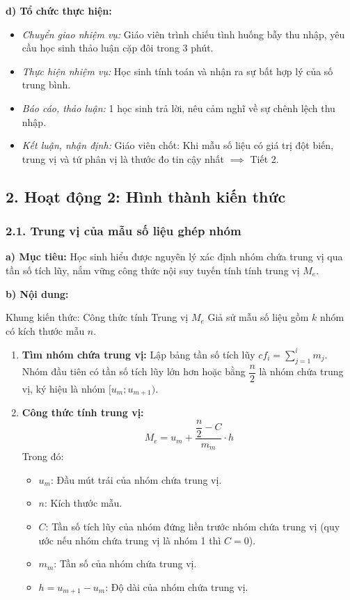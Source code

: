 \documentclass[12pt, a4paper]{article}
\begin{document}
\noindent \textbf{d) Tổ chức thực hiện:}
\begin{itemize}[leftmargin=0.8cm]
    \item \textit{Chuyển giao nhiệm vụ:} Giáo viên trình chiếu tình huống bẫy thu nhập, yêu cầu học sinh thảo luận cặp đôi trong 3 phút.
    \item \textit{Thực hiện nhiệm vụ:} Học sinh tính toán và nhận ra sự bất hợp lý của số trung bình.
    \item \textit{Báo cáo, thảo luận:} 1 học sinh trả lời, nêu cảm nghĩ về sự chênh lệch thu nhập.
    \item \textit{Kết luận, nhận định:} Giáo viên chốt: Khi mẫu số liệu có giá trị đột biến, trung vị và tứ phân vị là thước đo tin cậy nhất $\implies$ Tiết 2.
\end{itemize}

\subsection*{2. Hoạt động 2: Hình thành kiến thức}

\subsubsection*{2.1. Trung vị của mẫu số liệu ghép nhóm}

\noindent \textbf{a) Mục tiêu:}
Học sinh hiểu được nguyên lý xác định nhóm chứa trung vị qua tần số tích lũy, nắm vững công thức nội suy tuyến tính tính trung vị $M_e$.

\noindent \textbf{b) Nội dung:}
\begin{pedabox}{Khung kiến thức: Công thức tính Trung vị $M_e$}
Giả sử mẫu số liệu gồm $k$ nhóm có kích thước mẫu $n$.
\begin{enumerate}[leftmargin=0.6cm]
    \item \textbf{Tìm nhóm chứa trung vị:} Lập bảng tần số tích lũy $cf_i = \sum_{j=1}^i m_j$. Nhóm đầu tiên có tần số tích lũy lớn hơn hoặc bằng $\dfrac{n}{2}$ là nhóm chứa trung vị, ký hiệu là nhóm $[u_m; u_{m+1})$.
    \item \textbf{Công thức tính trung vị:}
    $$M_e = u_m + \dfrac{\dfrac{n}{2} - C}{m_m} \cdot h$$
    Trong đó:
    \begin{itemize}
        \item $u_m$: Đầu mút trái của nhóm chứa trung vị.
        \item $n$: Kích thước mẫu.
        \item $C$: Tần số tích lũy của nhóm đứng liền trước nhóm chứa trung vị (quy ước nếu nhóm chứa trung vị là nhóm 1 thì $C = 0$).
        \item $m_m$: Tần số của nhóm chứa trung vị.
        \item $h = u_{m+1} - u_m$: Độ dài của nhóm chứa trung vị.
    \end{itemize}
\end{enumerate}
\end{pedabox}
\end{document}
